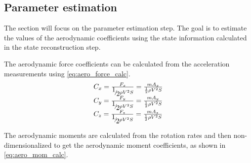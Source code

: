 \subsection{Parameter estimation}
The section will focus on the parameter estimation step. The goal is to estimate the values of the aerodynamic coefficients using the state information calculated in the state reconstruction step. 

The aerodynamic force coefficients can be calculated from the acceleration measurements using \ref{eq:aero_force_calc}.
\begin{equation}
    \begin{array}{l}
        {C_x} = \frac{{{F_x}}}{{{\raise0.7ex\hbox{$1$} \!\mathord{\left/
         {\vphantom {1 2}}\right.\kern-\nulldelimiterspace}
        \!\lower0.7ex\hbox{$2$}}\rho {V^2}S}} = \frac{{m{A_x}}}{{\frac{1}{2}\rho {V^2}S}}\\
        {C_y} = \frac{{{F_y}}}{{{\raise0.7ex\hbox{$1$} \!\mathord{\left/
         {\vphantom {1 2}}\right.\kern-\nulldelimiterspace}
        \!\lower0.7ex\hbox{$2$}}\rho {V^2}S}} = \frac{{m{A_y}}}{{\frac{1}{2}\rho {V^2}S}}\\
        {C_z} = \frac{{{F_z}}}{{{\raise0.7ex\hbox{$1$} \!\mathord{\left/
         {\vphantom {1 2}}\right.\kern-\nulldelimiterspace}
        \!\lower0.7ex\hbox{$2$}}\rho {V^2}S}} = \frac{{m{A_z}}}{{\frac{1}{2}\rho {V^2}S}}
        \end{array}
    \label{eq:aero_force_calc}
\end{equation}

The aerodynamic moments are calculated from the rotation rates and then non-dimensionalized to get the aerodynamic moment coefficients, as shown in \ref{eq:aero_mom_calc}.

